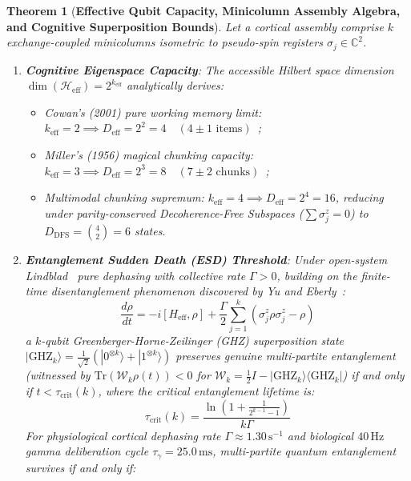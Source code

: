 \documentclass[10pt,twocolumn,3p]{article}
\newtheorem{theorem}{Theorem}
\begin{document}
\begin{theorem}[\textbf{Effective Qubit Capacity, Minicolumn Assembly Algebra, and Cognitive Superposition Bounds}]
\label{thm:qubit_capacity}
Let a cortical assembly comprise $k$ exchange-coupled minicolumns isometric to pseudo-spin registers $\sigma_j \in \mathbb{C}^2$.
\begin{enumerate}
    \item \textbf{Cognitive Eigenspace Capacity}: The accessible Hilbert space dimension $\dim(\mathcal{H}_{\text{eff}}) = 2^{k_{\text{eff}}}$ analytically derives:
    \begin{itemize}
        \item Cowan's (2001) pure working memory limit: $k_{\text{eff}} = 2 \implies D_{\text{eff}} = 2^2 = 4 \quad (4 \pm 1\text{ items})$~\cite{cowan2001};
        \item Miller's (1956) magical chunking capacity: $k_{\text{eff}} = 3 \implies D_{\text{eff}} = 2^3 = 8 \quad (7 \pm 2\text{ chunks})$~\cite{miller1956};
        \item Multimodal chunking supremum: $k_{\text{eff}} = 4 \implies D_{\text{eff}} = 2^4 = 16$, reducing under parity-conserved Decoherence-Free Subspaces ($\sum \sigma_j^z = 0$) to $D_{\text{DFS}} = \binom{4}{2} = 6$ states.
    \end{itemize}
    \item \textbf{Entanglement Sudden Death (ESD) Threshold}: Under open-system Lindblad~\cite{lindblad1976,gks1976} pure dephasing with collective rate $\Gamma > 0$, building on the finite-time disentanglement phenomenon discovered by Yu and Eberly~\cite{yueberly2004,yueberly2009}:
    \begin{equation}
        \frac{d\rho}{dt} = -i [H_{\text{eff}}, \rho] + \frac{\Gamma}{2} \sum_{j=1}^k \left( \sigma_j^z \rho \sigma_j^z - \rho \right)
    \end{equation}
    a $k$-qubit Greenberger-Horne-Zeilinger (GHZ) superposition state $|\text{GHZ}_k\rangle = \frac{1}{\sqrt{2}}(|0^{\otimes k}\rangle + |1^{\otimes k}\rangle)$ preserves genuine multi-partite entanglement (witnessed by $\text{Tr}(\mathcal{W}_k \rho(t)) < 0$ for $\mathcal{W}_k = \frac{1}{2}I - |\text{GHZ}_k\rangle\langle \text{GHZ}_k|$) if and only if $t < \tau_{\text{crit}}(k)$, where the critical entanglement lifetime is:
    \begin{equation}
        \tau_{\text{crit}}(k) = \frac{\ln\left(1 + \frac{1}{2^{k-1} - 1}\right)}{k \Gamma}
    \end{equation}
    For physiological cortical dephasing rate $\Gamma \approx 1.30\,\text{s}^{-1}$ and biological $40\,\text{Hz}$ gamma deliberation cycle $\tau_\gamma = 25.0\,\text{ms}$, multi-partite quantum entanglement survives if and only if:

\end{enumerate}
\end{theorem}
\end{document}
